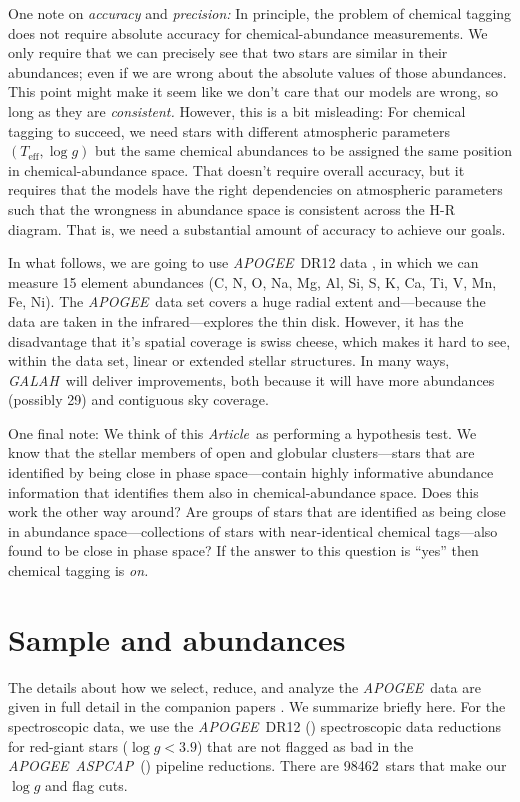 \documentclass[12pt, letterpaper, preprint]{aastex}
\newcommand{\acronym}[1]{{\small{#1}}}
\newcommand{\project}[1]{\textsl{#1}}
\newcommand{\apogee}{\project{\acronym{APOGEE}}}
\newcommand{\aspcap}{\project{\acronym{ASPCAP}}}
\newcommand{\galah}{\project{\acronym{GALAH}}}
\newcommand{\documentname}{\textsl{Article}}
\newcommand{\teff}{T_{\mathrm{eff}}}
\newcommand{\logg}{\log g}
\newcommand{\totalnumber}{98462} %
\begin{document}
One note on \emph{accuracy} and \emph{precision:}
In principle, the problem of chemical tagging does not require
absolute accuracy for chemical-abundance measurements.
We only require that we can precisely see that two stars are similar
in their abundances; even if we are wrong about the absolute values of
those abundances.
This point might make it seem like we don't care that our models are
wrong, so long as they are \emph{consistent.}
However, this is a bit misleading:
For chemical tagging to succeed, we need stars with different
atmospheric parameters $(\teff, \logg)$ but the same chemical
abundances to be assigned the same position in chemical-abundance
space.
That doesn't require overall accuracy, but it requires that the models
have the right dependencies on atmospheric parameters such that the
wrongness in abundance space is consistent across the H-R diagram.
That is, we need a substantial amount of accuracy to achieve our goals.

In what follows, we are going to use \apogee\ \acronym{DR12} data \citep{dr12}, in
which we can measure 15 element abundances (C, N, O, Na, Mg, Al, Si,
S, K, Ca, Ti, V, Mn, Fe, Ni).
The \apogee\ data set covers a huge radial extent and---because the
data are taken in the infrared---explores the thin disk.
However, it has the disadvantage that it's spatial coverage is swiss
cheese, which makes it hard to see, within the data set, linear or
extended stellar structures.
In many ways, \galah\ will deliver improvements, both because it will
have more abundances (possibly 29) and contiguous sky coverage.

One final note:
We think of this \documentname\ as performing a hypothesis test.
We know that the stellar members of open and globular clusters---stars
that are identified by being close in phase space---contain highly
informative abundance information that identifies them also in
chemical-abundance space.
Does this work the other way around?
Are groups of stars that are identified as being close in abundance
space---collections of stars with near-identical chemical tags---also
found to be close in phase space?
If the answer to this question is ``yes'' then chemical tagging is
\emph{on.}

\section{Sample and abundances}

The details about how we select, reduce, and analyze the \apogee\ data
are given in full detail in the companion papers \citep{casey16, ness16}.
We summarize briefly here.
For the spectroscopic data, we use the \apogee\ \acronym{DR12}
(\cite{dr12}) spectroscopic data reductions for red-giant stars
($\logg < 3.9$) that are not flagged as bad in the
\apogee\ \aspcap\ (\cite{aspcap}) pipeline reductions.
There are \totalnumber\ stars that make our $\logg$ and flag cuts.
\end{document}
